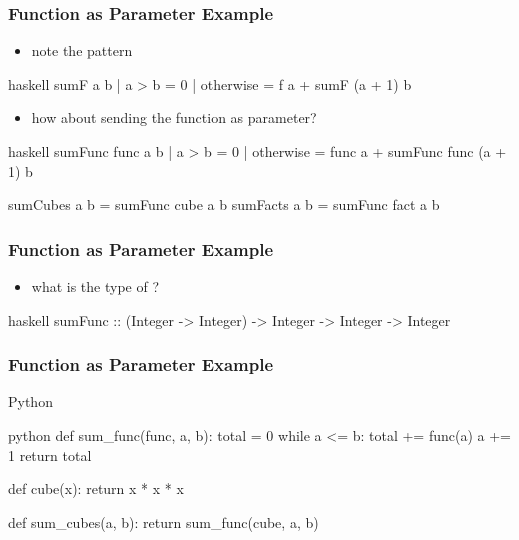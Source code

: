 \documentclass[dvipsnames]{beamer}
\theoremstyle{plain}
\begin{document}
\begin{frame}[fragile]
  \frametitle{Function as Parameter Example}

  \begin{itemize}
    \item note the pattern
  \end{itemize}

  \begin{exampleblock}{}
    \begin{pygments}{haskell}
sumF a b
  | a > b     = 0
  | otherwise = f a + sumF (a + 1) b
    \end{pygments}
  \end{exampleblock}

  \pause
  \begin{itemize}
    \item how about sending the function as parameter?
  \end{itemize}

  \begin{exampleblock}{}
    \begin{pygments}{haskell}
sumFunc func a b
  | a > b     = 0
  | otherwise = func a + sumFunc func (a + 1) b

sumCubes a b = sumFunc cube a b
sumFacts a b = sumFunc fact a b
    \end{pygments}
  \end{exampleblock}
\end{frame}

\begin{frame}[fragile]
  \frametitle{Function as Parameter Example}

  \begin{itemize}
    \item what is the type of ?
  \end{itemize}

  \pause
  \begin{exampleblock}{}
    \begin{pygments}{haskell}
sumFunc :: (Integer -> Integer)
              -> Integer -> Integer -> Integer
    \end{pygments}
  \end{exampleblock}
\end{frame}

\begin{frame}[fragile]
  \frametitle{Function as Parameter Example}

  \begin{exampleblock}{Python}
    \begin{pygments}{python}
def sum_func(func, a, b):
    total = 0
    while a <= b:
        total += func(a)
        a += 1
    return total

def cube(x):
    return x * x * x

def sum_cubes(a, b):
    return sum_func(cube, a, b)
    \end{pygments}
  \end{exampleblock}
\end{frame}
\end{document}
